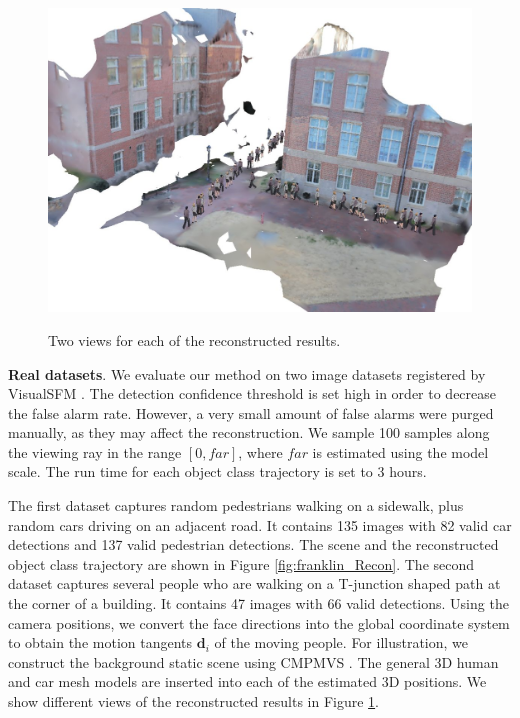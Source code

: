 \begin{figure}
{    \includegraphics[height=0.21\textheight]{chapter4/resource/tjunction2.jpg}
}
\caption[Example reconstruction results on two real datasets.]{Two views for each of the reconstructed results.}
\label{fig:reconstructed}
\end{figure}
\textbf{Real datasets}. We evaluate our method on two image datasets  registered by VisualSFM \cite{WuVSFM}. The detection confidence threshold  is set high in order to decrease the false alarm rate. However, a very small amount of false alarms were purged manually, as they may affect the reconstruction.  We sample 100 samples along the viewing ray in the range $[0,far]$, where $far$ is  estimated using the model scale. The run time for each object class trajectory is set to 3 hours.

The first dataset captures random pedestrians walking on a sidewalk, plus random cars driving on an adjacent road. It contains 135 images with 82 valid car detections and 137 valid pedestrian detections. The scene and the reconstructed object class trajectory are shown in Figure \ref{fig:franklin_Recon}. %
The second dataset captures several people who are walking on a T-junction shaped path at the corner of a building. It contains 47 images with 66 valid detections. Using the camera positions, we convert the face directions into the global coordinate system to obtain the motion tangents $\mathbf d_i$ of the moving people. For illustration, we construct the background static scene using CMPMVS \cite{JAN}. The general 3D human and car mesh models are inserted into each of the estimated 3D positions. We show different views of the reconstructed results in Figure \ref{fig:reconstructed}.

